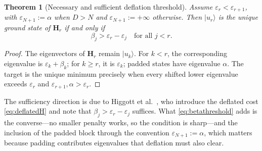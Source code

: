 \documentclass{ieeeaccess}
\newcommand{\Hq}{\mathbf{H}}
\newtheorem{theorem}{Theorem}
\begin{document}
\begin{theorem}[Necessary and sufficient deflation threshold]
Assume $\varepsilon_r<\varepsilon_{r+1}$, with $\varepsilon_{N+1}:=\alpha$ when $D>N$ and $\varepsilon_{N+1}:=+\infty$ otherwise. Then $|u_r\rangle$ is the unique ground state of $\Hq_r$ if and only if
\begin{equation}
\boxed{\beta_j>\varepsilon_r-\varepsilon_j\quad\text{for all }j<r.}
\label{eq:betathreshold}
\end{equation}
\end{theorem}

\begin{proof}
The eigenvectors of $\Hq_r$ remain $|u_k\rangle$. For $k<r$, the corresponding eigenvalue is $\varepsilon_k+\beta_k$; for $k\ge r$, it is $\varepsilon_k$; padded states have eigenvalue $\alpha$. The target is the unique minimum precisely when every shifted lower eigenvalue exceeds $\varepsilon_r$ and $\varepsilon_{r+1},\alpha>\varepsilon_r$.
\end{proof}

The sufficiency direction is due to Higgott et al.\ \cite{Higgott2019}, who introduce the deflated cost \cref{eq:deflatedH} and note that $\beta_j>\varepsilon_r-\varepsilon_j$ suffices. What \cref{eq:betathreshold} adds is the converse---no smaller penalty works, so the condition is sharp---and the inclusion of the padded block through the convention $\varepsilon_{N+1}:=\alpha$, which matters because padding contributes eigenvalues that deflation must also clear.
\end{document}
